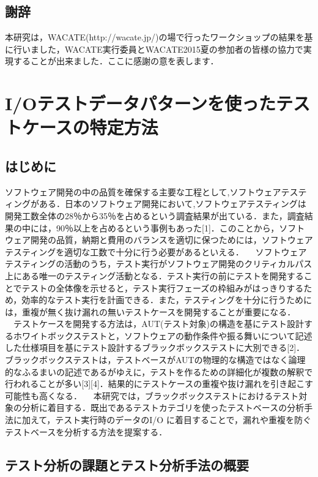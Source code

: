\documentclass[a4paper,11pt]{jreport}
\begin{document}
\section{謝辞}
本研究は，WACATE(http://wacate.jp/)の場で行ったワークショップの結果を基に行いました，WACATE実行委員とWACATE2015夏の参加者の皆様の協力で実現することが出来ました．ここに感謝の意を表します．


\chapter{I/Oテストデータパターンを使ったテストケースの特定方法}
\section{はじめに}
ソフトウェア開発の中の品質を確保する主要な工程として,ソフトウェアテスティングがある．日本のソフトウェア開発において,ソフトウェアテスティングは開発工数全体の28％から35％を占めるという調査結果が出ている．また，調査結果の中には，90％以上を占めるという事例もあった[1]．このことから，ソフトウェア開発の品質，納期と費用のバランスを適切に保つためには，ソフトウェアテスティングを適切な工数で十分に行う必要があるといえる．
　ソフトウェアテスティングの活動のうち，テスト実行がソフトウェア開発のクリティカルパス上にある唯一のテスティング活動となる．テスト実行の前にテストを開発することでテストの全体像を示せると，テスト実行フェーズの枠組みがはっきりするため，効率的なテスト実行を計画できる．また，テスティングを十分に行うためには，重複が無く抜け漏れの無いテストケースを開発することが重要になる．
　テストケースを開発する方法は，AUT(テスト対象)の構造を基にテスト設計するホワイトボックステストと，ソフトウェアの動作条件や振る舞いについて記述した仕様項目を基にテスト設計するブラックボックステストに大別できる[2]．ブラックボックステストは，テストベースがAUTの物理的な構造ではなく論理的なふるまいの記述であるがゆえに，テストを作るための詳細化が複数の解釈で行われることが多い[3][4]．結果的にテストケースの重複や抜け漏れを引き起こす可能性も高くなる．
　本研究では，ブラックボックステストにおけるテスト対象の分析に着目する．既出であるテストカテゴリを使ったテストベースの分析手法に加えて，テスト実行時のデータのI/O に着目することで，漏れや重複を防ぐテストベースを分析する方法を提案する．

\section{テスト分析の課題とテスト分析手法の概要}
\end{document}
